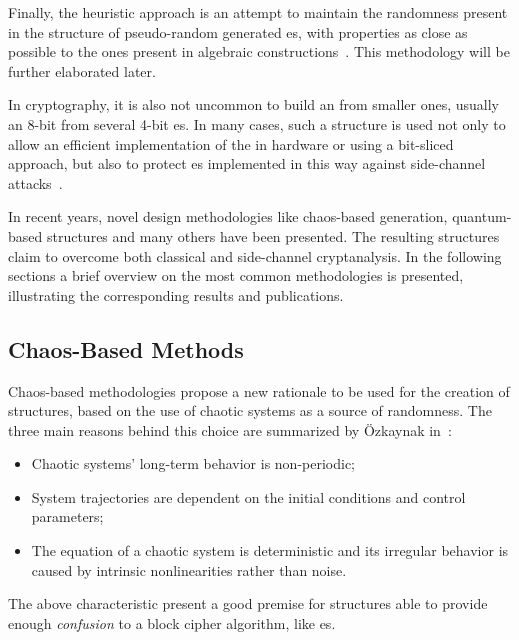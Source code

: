     Finally, the heuristic approach is an attempt to maintain the randomness present in the structure of pseudo-random generated \sbocs{}es, with properties as close as possible to the ones present in algebraic constructions~\cite{freyre2020evolving}. This methodology will be further elaborated later.

    In cryptography, it is also not uncommon to build an \sbocs{} from smaller ones, usually an 8-bit \sbocs{} from several 4-bit \sbocs{}es. In many cases, such a structure is used not only to allow an efficient implementation of the \sbocs{} in hardware or using a bit-sliced approach, but also to protect \sbocs{}es implemented in this way against side-channel attacks~\cite{de2017generation}.

    In recent years, novel design methodologies like chaos-based generation, quantum-based structures and many others have been presented. The resulting \sbocs{} structures claim to overcome both classical and side-channel cryptanalysis. In the following sections a brief overview on the most common methodologies is presented, illustrating the corresponding results and publications. 

    \subsection{Chaos-Based Methods}
        Chaos-based methodologies propose a new rationale to be used for the creation of \sbocs{} structures, based on the use of chaotic systems as a source of randomness. The three main reasons behind this choice are summarized by Özkaynak in~\cite{ozkaynak2019construction}:

        \begin{itemize}
            \item Chaotic systems’ long-term behavior is non-periodic;
            \item System trajectories are dependent on the initial conditions and control parameters;
            \item The equation of a chaotic system is deterministic and its irregular behavior is caused by intrinsic nonlinearities rather than noise.
        \end{itemize}

        \noindent The above characteristic present a good premise for structures able to provide enough \emph{confusion} to a block cipher algorithm, like \sbocs{}es.
        
